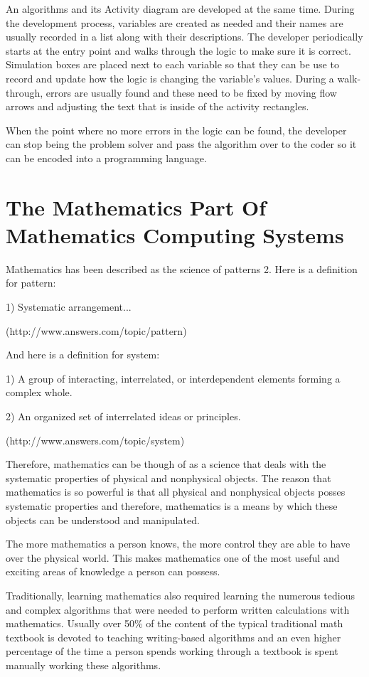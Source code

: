 \documentclass[12pt,oneside]{book}
\begin{document}
An algorithms and its Activity diagram are developed at the same time. During the development process, variables are created as needed and their names are usually recorded in a list along with their descriptions. The developer periodically starts at the entry point and walks through the logic to make sure it is correct. Simulation boxes are placed next to each variable so that they can be use to record and update how the logic is changing the variable's values. During a walk{}-through, errors are usually found and these need to be fixed by moving flow arrows and adjusting the text that is inside of the activity rectangles. 

When the point where no more errors in the logic can be found, the developer can stop being the problem solver and pass the algorithm over to the coder so it can be encoded into a programming language.

\section[The Mathematics Part Of Mathematics Computing Systems]{The Mathematics Part Of Mathematics Computing Systems}

Mathematics has been described as the {\textquotedbl}science of patterns{\textquotedbl} 2. Here is a definition for pattern: 

1) Systematic arrangement...

(http://www.answers.com/topic/pattern)


And here is a definition for system:


1) A group of interacting, interrelated, or interdependent elements
forming a complex whole.


2) An organized set of interrelated ideas or principles.

(http://www.answers.com/topic/system)


Therefore, mathematics can be though of as a science that deals with the systematic properties of physical and nonphysical objects. The reason that mathematics is so powerful is that all physical and nonphysical objects posses systematic properties and therefore, mathematics is a means by which these objects can be understood and manipulated. 

The more mathematics a person knows, the more control they are able to have over the physical world. This makes mathematics one of the most useful and exciting areas of knowledge a person can possess. 

Traditionally, learning mathematics also required learning the numerous tedious and complex algorithms that were needed to perform written calculations with mathematics. Usually over 50\% of the content of the typical traditional math textbook is devoted to teaching writing{}-based algorithms and an even higher percentage of the time a person spends working through a textbook is spent manually working these algorithms. 
\end{document}
